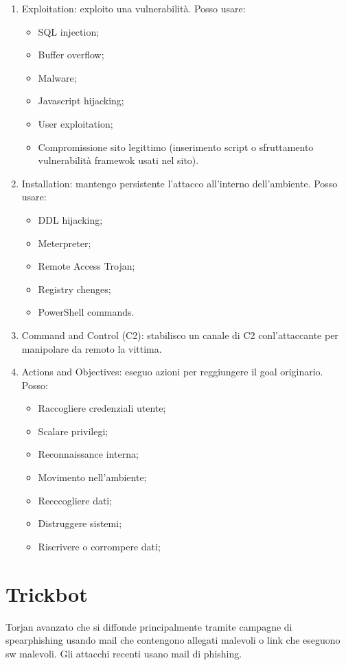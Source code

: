 \begin{enumerate}
\item Exploitation: exploito una vulnerabilità. Posso usare:
\begin{itemize}
    \item  SQL injection;
    \item Buffer overflow;
    \item Malware;
    \item Javascript hijacking;
    \item User exploitation;
    \item Compromissione sito legittimo (inserimento script o sfruttamento vulnerabilità framewok usati nel sito).
\end{itemize}

\item Installation: mantengo persistente l'attacco all'interno dell'ambiente. Posso usare:
\begin{itemize}
    \item DDL hijacking;
\item Meterpreter;
\item Remote Access Trojan;
\item Registry chenges;
\item PowerShell commands.
\end{itemize}

\item Command and Control (C2): stabilisco un canale di C2 conl'attaccante per manipolare da remoto la vittima.

\item Actions and Objectives: eseguo azioni per reggiungere il goal originario. Posso:
\begin{itemize}
    \item Raccogliere credenziali utente;
\item Scalare privilegi;
\item Reconnaissance interna;
\item Movimento nell'ambiente;
\item Recccogliere dati;
\item Distruggere sistemi;
\item Riscrivere o corrompere dati;
\end{itemize}
\end{enumerate}

\section{Trickbot}
Torjan avanzato che si diffonde principalmente tramite campagne di spearphishing usando mail che contengono allegati malevoli o link che eseguono sw malevoli. Gli attacchi recenti usano mail di phishing.